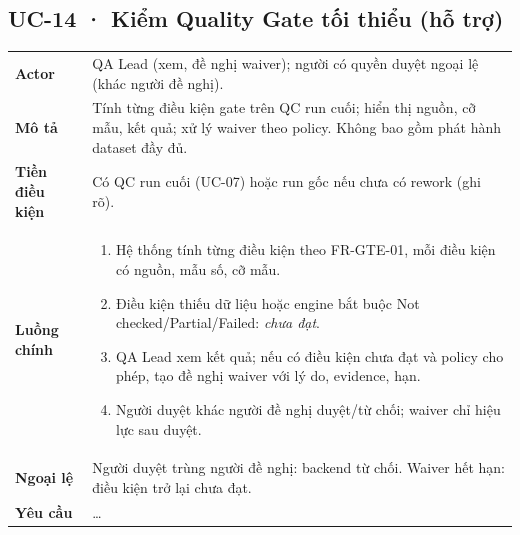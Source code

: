 \subsection*{UC-14 · Kiểm Quality Gate tối thiểu (hỗ trợ)}
\begin{xltabular}{\linewidth}{@{}>{\bfseries}L{3.2cm}Y@{}}
\toprule
Actor & QA Lead (xem, đề nghị waiver); người có quyền duyệt ngoại lệ (khác người đề nghị).\\
Mô tả & Tính từng điều kiện gate trên QC run cuối; hiển thị nguồn, cỡ mẫu, kết quả; xử lý waiver theo policy. Không bao gồm phát hành dataset đầy đủ.\\
Tiền điều kiện & Có QC run cuối (UC-07) hoặc run gốc nếu chưa có rework (ghi rõ).\\
Luồng chính &
\begin{enumerate}[nosep]
  \item Hệ thống tính từng điều kiện theo FR-GTE-01, mỗi điều kiện có nguồn, mẫu số, cỡ mẫu.
  \item Điều kiện thiếu dữ liệu hoặc engine bắt buộc Not checked/Partial/Failed: \emph{chưa đạt}.
  \item QA Lead xem kết quả; nếu có điều kiện chưa đạt và policy cho phép, tạo đề nghị waiver với lý do, evidence, hạn.
  \item Người duyệt khác người đề nghị duyệt/từ chối; waiver chỉ hiệu lực sau duyệt.
\end{enumerate}\\
Ngoại lệ & Người duyệt trùng người đề nghị: backend từ chối. Waiver hết hạn: điều kiện trở lại chưa đạt.\\
Yêu cầu & …\\
\bottomrule
\end{xltabular}

